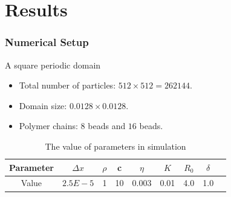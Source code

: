 \section{Results}
\begin{frame}
\frametitle{Numerical Setup} 
\begin{block}{A square periodic domain}
 \begin{itemize}
  \item Total number of particles: $512 \times 512 = 262144$.
  \item Domain size: $ 0.0128\times 0.0128$.
  \item Polymer chains: $8$ beads and $16$ beads.
 \end{itemize}
\begin{table}
\begin{center}
  \begin{tabular}{| c | c | c |  c| c | c | c | c | c |}
    \hline
    Parameter & $\Delta x$ & $\rho$ & c & $\eta$ & $K$ & $R_0$ & $\delta$ \\ 
    \hline
    Value & $2.5E-5$ & 1 & 10 & 0.003 & 0.01 & 4.0 & 1.0 \\ 
   \hline
  \end{tabular}
\end{center}
\caption {The value of parameters in simulation}
\label{tab:roll}
\end{table}
\end{block}



\end{frame}


